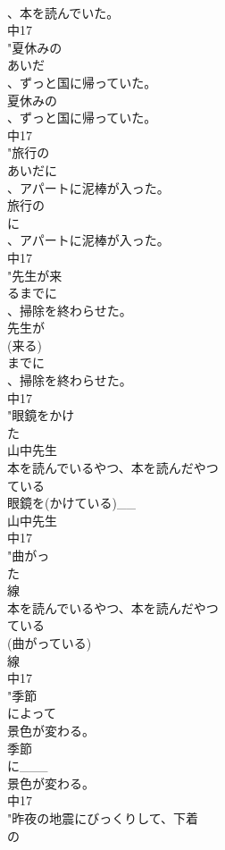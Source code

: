 \documentclass[8pt]{extreport}
\begin{document}
\begin{CJK}{UTF8}{min}
\\	、本を読んでいた。
\\	中17
\\	"夏休みの
\\	あいだ
\\	、ずっと国に帰っていた。
\\	夏休みの
\\	、ずっと国に帰っていた。
\\	中17
\\	"旅行の
\\	あいだに
\\	、アパートに泥棒が入った。
\\	旅行の
\\	に
\\	、アパートに泥棒が入った。
\\	中17
\\	"先生が来
\\	るまでに
\\	、掃除を終わらせた。
\\	先生が
\\	(来る)
\\	までに
\\	、掃除を終わらせた。
\\	中17
\\	"眼鏡をかけ
\\	た
\\	山中先生
\\	本を読んでいるやつ、本を読んだやつ
\\	ている 
\\	眼鏡を(かけている)__
\\	山中先生
\\	中17
\\	"曲がっ
\\	た
\\	線
\\	本を読んでいるやつ、本を読んだやつ
\\	ている 
\\	(曲がっている)
\\	線
\\	中17
\\	"季節
\\	によって
\\	景色が変わる。
\\	季節
\\	に___
\\	景色が変わる。
\\	中17
\\	"昨夜の地震にびっくりして、下着
\\	の

\end{CJK}
\end{document}
